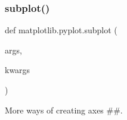 \mbox{\label{namespacematplotlib_1_1pyplot_a8278cc1551039e364e92fde41a2a3ba2}} 
\subsubsection{\texorpdfstring{subplot()}{subplot()}}
{\footnotesize\ttfamily def matplotlib.\+pyplot.\+subplot (\begin{DoxyParamCaption}\item[{}]{args,  }\item[{}]{kwargs }\end{DoxyParamCaption})}



More ways of creating axes \#\#. 

